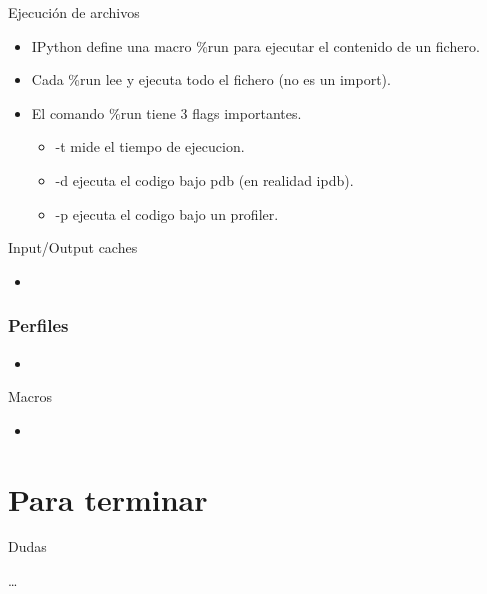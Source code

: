 \documentclass[10pt]{beamer}
\begin{document}
  \begin{frame}{Ejecución de archivos}
    \begin{itemize}
      \item IPython define una macro \%run para ejecutar el contenido de un fichero.
      \item Cada \%run lee y ejecuta todo el fichero (no es un import).
      \item El comando \%run tiene 3 flags importantes.
      \begin{itemize}
        \item -t mide el tiempo de ejecucion.
        \item -d ejecuta el codigo bajo pdb (en realidad ipdb).
        \item -p ejecuta el codigo bajo un profiler.
      \end{itemize}
    \end{itemize}
  \end{frame}

  \begin{frame}{Input/Output caches}
    \begin{itemize}
      \item 
    \end{itemize}
  \end{frame}

  \begin{frame}
    \frametitle{Perfiles}
    \begin{itemize}
      \item 
    \end{itemize}
  \end{frame}
  
  \begin{frame}{Macros}
    \begin{itemize}
      \item 
    \end{itemize}
  \end{frame}

  \section*{Para terminar}

  \begin{frame}{Dudas}
    \begin{center}
      \dots
    \end{center}
  \end{frame}
\end{document}
